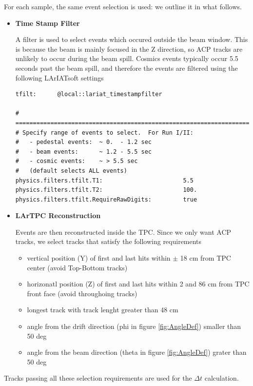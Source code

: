 For each sample, the same event selection is used: we outline it in what follows.
\begin{itemize}
\item \textbf{Time Stamp Filter}

A filter is used to select events which occured outside the beam window. This is because the beam is mainly focused in the Z direction, so ACP tracks are unlikely to occur during the beam spill. Cosmics events typically occur 5.5 seconds past the beam spill, and therefore the events are filtered using the following LArIATsoft settings

\begin{verbatim}
tfilt:      @local::lariat_timestampfilter

# ====================================================================
# Specify range of events to select.  For Run I/II:
#   - pedestal events:  ~ 0.  - 1.2 sec
#   - beam events:      ~ 1.2 - 5.5 sec
#   - cosmic events:    ~ > 5.5 sec
#   (default selects ALL events)
physics.filters.tfilt.T1:                       5.5
physics.filters.tfilt.T2:                       100.
physics.filters.tfilt.RequireRawDigits:         true

\end{verbatim}


\item \textbf{LArTPC Reconstruction}

Events are then reconstructed inside the TPC. Since we only want ACP tracks, we select tracks that satisfy the following requirements

\begin{itemize}
\item vertical position (Y) of first and last hits within $\pm$ 18 cm from TPC center (avoid Top-Bottom tracks) 
\item horizonatl position (Z) of first and last hits within 2 and 86 cm from TPC front face (avoid throughoing tracks) 
\item longest track with track lenght greater than 48 cm
\item angle from the drift direction (phi in figure \ref{fig:AngleDef}) smaller than 50 deg 
\item angle from the beam direction (theta in figure \ref{fig:AngleDef}) grater than 50 deg
\end{itemize}




\end{itemize}

Tracks passing all these selection requirements are used for the $\Delta t$ calculation.


